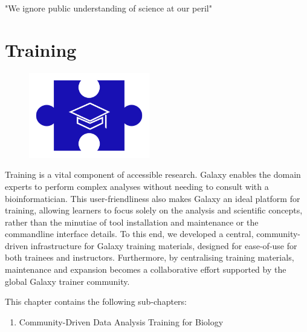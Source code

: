 \begin{savequote}[75mm]
"We ignore public understanding of science at our peril"
\end{savequote}

\chapter{Training}\label{chapter:training}

\begin{figure}[t!]
\includegraphics[height=10em]{frontmatter/images/chapter-header-training.png}
\end{figure}
\setcounter{figure}{-1}
\setcounter{table}{-1}
\setcounter{section}{-1}

Training is a vital component of accessible research. Galaxy enables the domain experts to perform complex analyses without needing to consult with a bioinformatician. This user-friendliness also makes Galaxy an ideal platform for training, allowing learners to focus solely on the analysis and scientific concepts, rather than the minutiae of tool installation and maintenance or the commandline interface details. To this end, we developed a central, community-driven infrastructure for Galaxy training materials, designed for ease-of-use for both trainees and instructors. Furthermore, by centralising training materials, maintenance and expansion becomes a collaborative effort supported by the global Galaxy trainer community.

This chapter contains the following sub-chapters:

\begin{enumerate}[label=\ref{chapter:training}.\arabic*]
\itemsep-0.5em
\setcounter{enumi}{-1}
\item Community-Driven Data Analysis Training for Biology
\end{enumerate}

